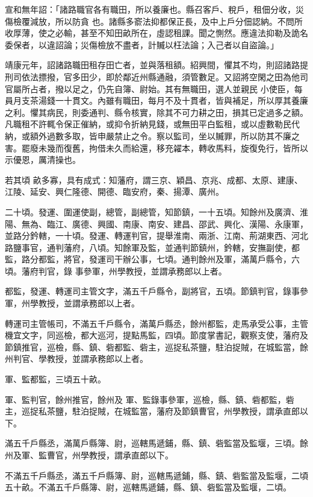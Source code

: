 \begin{pinyinscope}
 宣和無年詔：「諸路職官各有職田，所以養廉也。縣召客戶、稅戶，租佃分收，災傷檢覆減放，所以防貪
 也。諸縣多窬法抑都保正長，及中上戶分佃認納。不問所收厚薄，使之必輸，甚至不知田畝所在，虛認租課。聞之惻然。應違法抑勒及詭名委保者，以違詔論；災傷檢放不盡者，計贓以枉法論；入己者以自盜論。」



 靖康元年，詔諸路職田租存田亡者，並與落租額。紹興間，懼其不均，則詔諸路提刑司依法摽撥，官多田少，即於鄰近州縣通融，須管數足。又詔將空閑之田為他司官屬所占者，撥以足之，仍先自簿、尉始。其有無職田，選人並親民
 小使臣，每員月支茶湯錢一十貫文。內雖有職田，每月不及十貫者，皆與補足，所以厚其養廉之利。懼其病民，則委通判、縣令核實，除其不可力耕之田，損其已定過多之額。凡職租不許輒令保正催納，或抑令折納見錢，或無田平白監租，或以虛數勒民代納，或額外過數多取，皆申嚴禁止之令。察以監司，坐以贓罪，所以防其不廉之害。罷廢未幾而復舊，拘借未久而給還，移充糴本，轉收馬料，旋復免行，皆所以示優恩，厲清操也。



 若其頃
 畝多寡，具有成式：知藩府，謂三京、穎昌、京兆、成都、太原、建康、江陵、延安、興仁隆德、開德、臨安府，秦、揚潭、廣州。



 二十頃。發運、圍運使副，總管，副總管，知節鎮，一十五頃。知餘州及廣濟、淮陽、無為、臨江、廣德、興國、南康、南安、建昌、邵武、興化、漢陽、永康軍，並路分鈐轄，一十頃。發運、轉運判官，提舉淮南、兩浙、江南、荊湖東西、河北路鹽事官，通判藩府，八頃。知餘軍及監，並通判節鎮州，鈐轄，安撫副使，都監，路分都監，將官，發運司干辦公事，七頃。通判餘州及軍，滿萬戶縣令，六頃。藩府判官，錄
 事參軍，州學教授，並謂承務郎以上者。



 都監，發運、轉運司主管文字，滿五千戶縣令，副將官，五頃。節鎮判官，錄事參軍，州學教授，並謂承務郎以上者。



 轉運司主管帳司，不滿五千戶縣令，滿萬戶縣丞，餘州都監，走馬承受公事，主管機宜文字，同巡檢，都大巡河，提點馬監，四頃。節度掌書記，觀察支使，藩府及節鎮推官，巡檢，縣、鎮、砦都監、砦主，巡捉私茶鹽，駐泊捉賊，在城監當，餘州判官、學教授，並謂承務郎以上者。



 軍、監都監，三頃五十畝。



 軍、監判官，餘州推官，餘州及
 軍、監錄事參軍，巡檢，縣、鎮、砦都監，砦主，巡捉私茶鹽，駐泊捉賊，在城監當，藩府及節鎮曹官，州學教授，謂承直郎以下。



 滿五千戶縣丞，滿萬戶縣簿、尉，巡轄馬遞鋪，縣、鎮、砦監當及監堰，三頃。餘州及軍、監曹官，州學教授，謂承直郎以下。



 不滿五千戶縣丞，滿五千戶縣簿、尉，巡轄馬遞鋪，縣、鎮、砦監當及監堰，二頃五十畝。不滿五千戶縣簿、尉，巡轄馬遞鋪，縣、鎮、砦監當及監堰，二頃。



\end{pinyinscope}